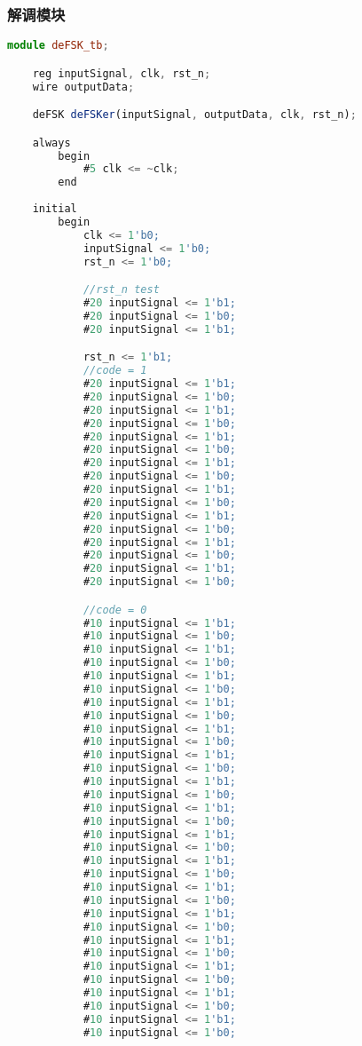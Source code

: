 \documentclass{progartcn}
\begin{document}
\subsubsection{解调模块}
\begin{lstlisting}[language=TypeScript,caption={deFSK\_tb.v}]
module deFSK_tb;

    reg inputSignal, clk, rst_n;
    wire outputData;

    deFSK deFSKer(inputSignal, outputData, clk, rst_n);

    always
        begin
            #5 clk <= ~clk;
        end
    
    initial
        begin
            clk <= 1'b0;
            inputSignal <= 1'b0;
            rst_n <= 1'b0;

            //rst_n test
            #20 inputSignal <= 1'b1;
            #20 inputSignal <= 1'b0;
            #20 inputSignal <= 1'b1;

            rst_n <= 1'b1;
            //code = 1
            #20 inputSignal <= 1'b1;
            #20 inputSignal <= 1'b0;
            #20 inputSignal <= 1'b1;
            #20 inputSignal <= 1'b0;
            #20 inputSignal <= 1'b1;
            #20 inputSignal <= 1'b0;
            #20 inputSignal <= 1'b1;
            #20 inputSignal <= 1'b0;
            #20 inputSignal <= 1'b1;
            #20 inputSignal <= 1'b0;
            #20 inputSignal <= 1'b1;
            #20 inputSignal <= 1'b0;
            #20 inputSignal <= 1'b1;
            #20 inputSignal <= 1'b0;
            #20 inputSignal <= 1'b1;
            #20 inputSignal <= 1'b0;

            //code = 0
            #10 inputSignal <= 1'b1;
            #10 inputSignal <= 1'b0;
            #10 inputSignal <= 1'b1;
            #10 inputSignal <= 1'b0;
            #10 inputSignal <= 1'b1;
            #10 inputSignal <= 1'b0;
            #10 inputSignal <= 1'b1;
            #10 inputSignal <= 1'b0;
            #10 inputSignal <= 1'b1;
            #10 inputSignal <= 1'b0;
            #10 inputSignal <= 1'b1;
            #10 inputSignal <= 1'b0;
            #10 inputSignal <= 1'b1;
            #10 inputSignal <= 1'b0;
            #10 inputSignal <= 1'b1;
            #10 inputSignal <= 1'b0;
            #10 inputSignal <= 1'b1;
            #10 inputSignal <= 1'b0;
            #10 inputSignal <= 1'b1;
            #10 inputSignal <= 1'b0;
            #10 inputSignal <= 1'b1;
            #10 inputSignal <= 1'b0;
            #10 inputSignal <= 1'b1;
            #10 inputSignal <= 1'b0;
            #10 inputSignal <= 1'b1;
            #10 inputSignal <= 1'b0;
            #10 inputSignal <= 1'b1;
            #10 inputSignal <= 1'b0;
            #10 inputSignal <= 1'b1;
            #10 inputSignal <= 1'b0;
            #10 inputSignal <= 1'b1;
            #10 inputSignal <= 1'b0;


\end{lstlisting}
\end{document}
